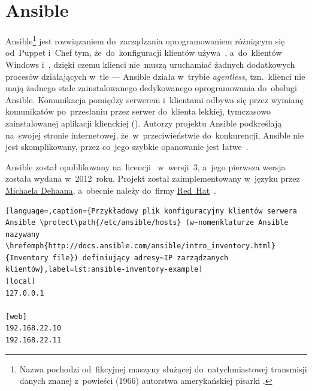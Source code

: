 \documentclass[thesis]{subfiles}
\begin{document}
\section{Ansible}
\label{sec:ansible}

Ansible\footnote{Nazwa  pochodzi od~fikcyjnej maszyny służącej do~natychmiastowej transmisji danych znanej z~powieści  (1966) autorstwa amerykańskiej pisarki .} jest rozwiązaniem do~zarządzania oprogramowaniem różniącym się od~Puppet i~Chef tym, że~do~konfiguracji klientów  używa~\ssh{}, a~do~klientów Windows  i~, dzięki czemu klienci nie~muszą uruchamiać żadnych dodatkowych procesów działających w~tle --- Ansible działa w~trybie \emph{agentless}, tzn.~klienci nie mają żadnego stale zainstalowanego dedykowanego oprogramowania do~obsługi Ansible. Komunikacja pomiędzy serwerem i~klientami odbywa się przez wymianę komunikatów \json{} po~przesłaniu przez serwer do~klienta lekkiej, tymczasowo zainstalowanej aplikacji klienckiej (). Autorzy projektu Ansible podkreślają na~swojej stronie internetowej, że~w~przeciwieństwie do~konkurencji, Ansible nie jest skomplikowany, przez co~jego szybkie opanowanie jest łatwe~\cite{ansible}.

Ansible został opublikowany na~licencji~ w~wersji~3, a~jego pierwsza wersja została wydana w~2012~roku. Projekt został zaimplementowany w~języku \python{} przez \href{http://michaeldehaan.net/}{\mbox{Michaela} \mbox{Dehaana}}, a~obecnie należy do~firmy \href{https://en.wikipedia.org/wiki/Red_Hat}{Red~Hat}~\cite{ansible-github}.


\begin{lstlisting}[language=,caption={Przykładowy plik konfiguracyjny klientów serwera Ansible \protect\path{/etc/ansible/hosts} (w~nomenklaturze Ansible nazywany \hrefemph{http://docs.ansible.com/ansible/intro_inventory.html}{Inventory file}) definiujący adresy~IP zarządzanych klientów},label=lst:ansible-inventory-example]
[local]
127.0.0.1

[web]
192.168.22.10
192.168.22.11
\end{lstlisting}
\end{document}
